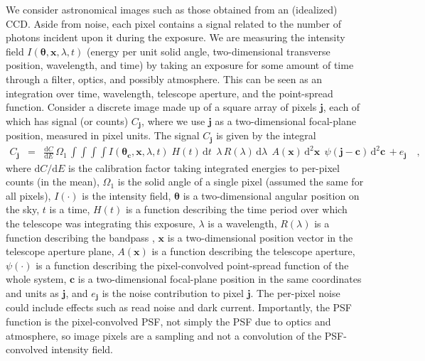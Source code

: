 \documentclass[letterpaper,preprint]{aastex}
\newcommand{\dd}{\mathrm{d}}
\newcommand{\noise}{e}
\renewcommand{\vec}[1]{\boldsymbol{#1}}
\newcommand{\thetavec}{\vec{\theta}}
\newcommand{\jvec}{\vec{j}}
\newcommand{\cvec}{\vec{c}}
\newcommand{\posvec}{\vec{x}}
\begin{document}
We consider astronomical images such as those obtained from an
(idealized) CCD.  Aside from noise, each pixel contains a signal
related to the number of photons incident upon it during the exposure.
%
We are measuring the intensity field $I(\thetavec,\posvec,\lambda,t)$
(energy per unit solid angle, two-dimensional transverse position,
wavelength, and time) by taking an exposure for some amount of time
through a filter, optics, and possibly atmosphere.  This can be seen
as an integration over time, wavelength, telescope aperture, and the
point-spread function.
%
Consider a discrete image made up of a square array of pixels $\jvec$,
each of which has signal (or counts) $C_{\jvec}$, where we use $\jvec$
as a two-dimensional focal-plane position, measured in pixel units.
The signal $C_{\jvec}$ is given by the integral
\begin{eqnarray}\displaystyle
C_{\jvec} &=& \frac{\dd C}{\dd E}\,\Omega_1\, %
\!
\int \!\!\!
\int \!\!\!
\int \!\!\!
\int
I(\thetavec_{\cvec},\posvec,\lambda,t)
\;H(t)\,
\dd t\,
\;
\lambda\,R(\lambda)\,
\dd\lambda\,
\;
A(\posvec)\,
\dd^2\posvec\,
\;
\psi(\jvec - \cvec)\,
\dd^2\cvec\,
 + \noise_{\jvec}
\quad,
\label{eqn:bigint}
\end{eqnarray}
where 
%
$\dd C/\dd E$ is the calibration factor taking integrated energies to per-pixel counts (in the mean),
%
$\Omega_1$ is the solid angle of a single pixel (assumed the same for all pixels),
%
$I(\cdot)$ is the intensity field,
%
$\thetavec$ is a two-dimensional angular position on the sky,
%
$t$ is a time, $H(t)$ is a function describing the time period over which the telescope was
integrating this exposure,
%
$\lambda$ is a wavelength, $R(\lambda)$ is a function describing the bandpass \cite{kcorrect},
%
$\posvec$ is a two-dimensional position vector in the telescope aperture plane,
%
$A(\posvec)$ is a function describing the telescope aperture,
%
$\psi(\cdot)$ is a function describing the pixel-convolved point-spread function of the
whole system,
%
$\cvec$ is a two-dimensional focal-plane position in the same coordinates and units as $\jvec$,
%
and
$\noise_{\jvec}$ is the noise contribution to pixel $\jvec$.
%
The per-pixel noise could include effects such as read noise and dark current.
%
Importantly, the PSF function is the pixel-convolved PSF, not simply
the PSF due to optics and atmosphere, so image pixels are a sampling
and not a convolution of the PSF-convolved intensity field.
\end{document}
